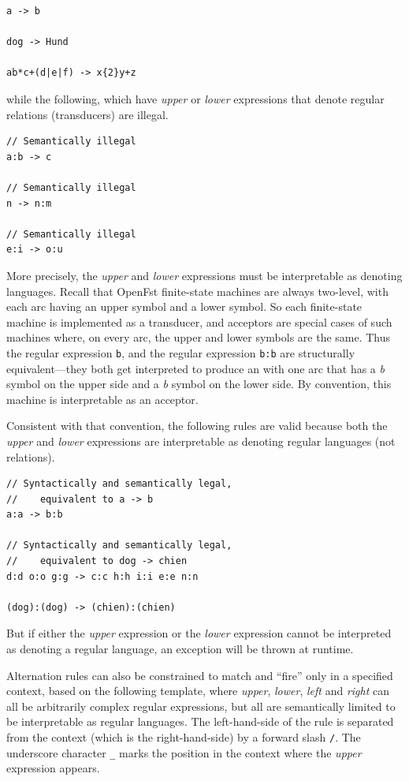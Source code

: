 \begin{Verbatim}
a -> b

dog -> Hund

ab*c+(d|e|f) -> x{2}y+z
\end{Verbatim}

\noindent
while the following, which have \emph{upper} or \emph{lower} expressions that denote regular relations
(transducers) are illegal.

\begin{Verbatim}
// Semantically illegal
a:b -> c

// Semantically illegal
n -> n:m

// Semantically illegal
e:i -> o:u
\end{Verbatim}


More precisely, the \emph{upper} and \emph{lower} expressions must be interpretable as denoting
languages.  Recall that OpenFst finite-state machines are always two-level, with each arc having an
upper symbol and a lower symbol.  So each finite-state machine is implemented as a transducer, and
acceptors are special cases of such machines where, on every arc, the upper and lower symbols are the
same.  Thus the regular expression \texttt{b}, and the regular expression \texttt{b:b} are structurally
equivalent---they both get interpreted to produce an \fsm{} with one arc that has a \emph{b} symbol on
the upper side and a \emph{b} symbol on the lower side.  By convention, this machine is interpretable
as an acceptor.

Consistent with that convention, the following rules are valid because both the \emph{upper} and
\emph{lower} expressions are interpretable as denoting regular languages (not relations).

\begin{Verbatim}
// Syntactically and semantically legal, 
//    equivalent to a -> b
a:a -> b:b

// Syntactically and semantically legal, 
//    equivalent to dog -> chien
d:d o:o g:g -> c:c h:h i:i e:e n:n

(dog):(dog) -> (chien):(chien)
\end{Verbatim}

\noindent
But if either the \emph{upper} expression or the \emph{lower} expression cannot be interpreted as
denoting a regular language, an exception will be thrown at runtime.

Alternation rules can also be constrained to match and ``fire'' only in a specified context, based on
the following template, where \emph{upper}, \emph{lower}, \emph{left} and \emph{right} can all be
arbitrarily complex regular expressions, but all are semantically limited to be interpretable as
regular languages.  The left-hand-side of the rule is separated from the context (which is the
right-hand-side) by a forward slash \texttt{/}. The underscore
character \texttt{\_} marks the position in the context where the \emph{upper} expression appears.
 

